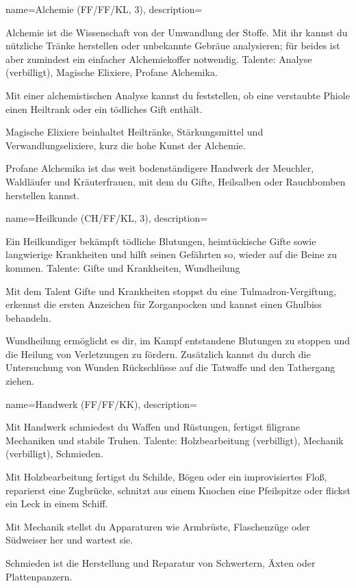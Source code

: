 {
    name={Alchemie (FF/FF/KL, 3)},
    description={Alchemie ist die Wissenschaft von der Umwandlung der Stoffe. Mit ihr kannst du nützliche Tränke herstellen oder unbekannte Gebräue analysieren; für beides ist aber zumindest ein einfacher Alchemiekoffer notwendig. Talente: Analyse (verbilligt), Magische Elixiere, Profane Alchemika.
\begin{description}
\item Mit einer alchemistischen Analyse kannst du feststellen, ob eine verstaubte Phiole einen Heiltrank oder ein tödliches Gift enthält.
\item Magische Elixiere beinhaltet Heiltränke, Stärkungsmittel und Verwandlungselixiere, kurz die hohe Kunst der Alchemie.
\item Profane Alchemika ist das weit bodenständigere Handwerk der Meuchler, Waldläufer und Kräuterfrauen, mit dem du Gifte, Heilsalben oder Rauchbomben herstellen kannst.
\end{description}}}

{
    name={Heilkunde (CH/FF/KL, 3)},
    description={Ein Heilkundiger bekämpft tödliche Blutungen, heimtückische Gifte sowie langwierige Krankheiten und hilft seinen Gefährten so, wieder auf die Beine zu kommen. Talente: Gifte und Krankheiten, Wundheilung
\begin{description}
\item Mit dem Talent Gifte und Krankheiten stoppst du eine Tulmadron-Vergiftung, erkennst die ersten Anzeichen für Zorganpocken und kannst einen Ghulbiss behandeln.
\item Wundheilung ermöglicht es dir, im Kampf entstandene Blutungen zu stoppen und die Heilung von Verletzungen zu fördern. Zusätzlich kannst du durch die Untersuchung von Wunden Rückschlüsse auf die Tatwaffe und den Tathergang ziehen.
\end{description}}}

{
    name={Handwerk (FF/FF/KK)},
    description={Mit Handwerk schmiedest du Waffen und Rüstungen, fertigst filigrane Mechaniken und stabile Truhen. Talente: Holzbearbeitung (verbilligt), Mechanik (verbilligt), Schmieden.
\begin{description}
\item Mit Holzbearbeitung fertigst du Schilde, Bögen oder ein improvisiertes Floß, reparierst eine Zugbrücke, schnitzt aus einem Knochen eine Pfeilspitze oder flickst ein Leck in einem Schiff.
\item Mit Mechanik stellst du Apparaturen wie Armbrüste, Flaschenzüge oder Südweiser her und wartest sie.
\item Schmieden ist die Herstellung und Reparatur von Schwertern, Äxten oder Plattenpanzern.
\end{description}}}

